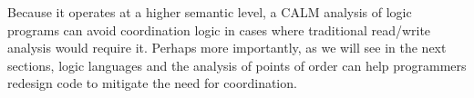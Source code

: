 Because it operates at a higher semantic level, a CALM analysis of logic programs can avoid coordination logic in cases where traditional read/write analysis would require it.  Perhaps more importantly, as we will see in the next sections, logic languages and the analysis of points of order can help programmers redesign code to mitigate the need for coordination.


% 




